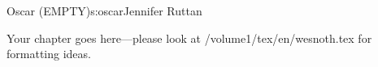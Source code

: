 \begin{aosachapter}{Oscar (EMPTY)}{s:oscar}{Jennifer Ruttan}

Your chapter goes here---please look at /volume1/tex/en/wesnoth.tex for 
formatting ideas.

\end{aosachapter}
